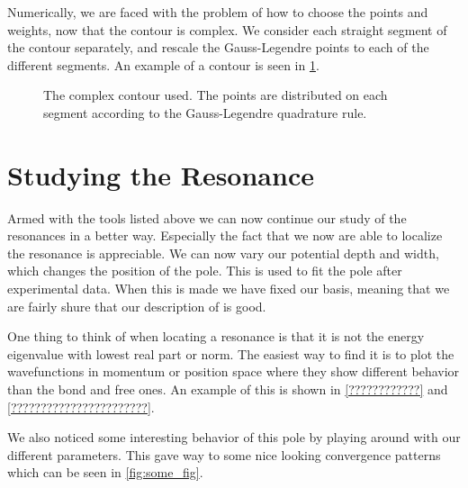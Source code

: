 Numerically, we are faced with the problem of how to choose 
the points and weights, now that the contour is complex. 
We consider each straight segment of the contour separately, 
and rescale the Gauss-Legendre points to each of the different segments.
An example of a contour is seen in 
\cref{fig:triangle contour}.

\begin{figure}[H]
  \centering
  \caption{The complex contour used. The points are distributed on each segment according to the Gauss-Legendre quadrature rule.}
  \label{fig:triangle contour}
\end{figure}

\section{Studying the Resonance}
Armed with the tools listed above we can now continue our study of the resonances in a better way.
Especially the fact that we now are able to localize the resonance is appreciable.
We can now vary our potential depth and width, which changes the position of the pole.
This is used to fit the pole after experimental data.
When this is made we have fixed our basis, meaning that we are fairly shure that our description of  is good.

One thing to think of when locating a resonance is that it is not the energy eigenvalue with lowest real part or norm.
The easiest way to find it is to plot the wavefunctions in momentum or position space where they show different behavior than the bond and free ones.
An example of this is shown in \cref{????????????} and \cref{???????????????????????}.

We also noticed some interesting behavior of this pole by playing around with our different parameters.
This gave way to some nice looking convergence patterns which can be seen in \cref{fig:some_fig}.


